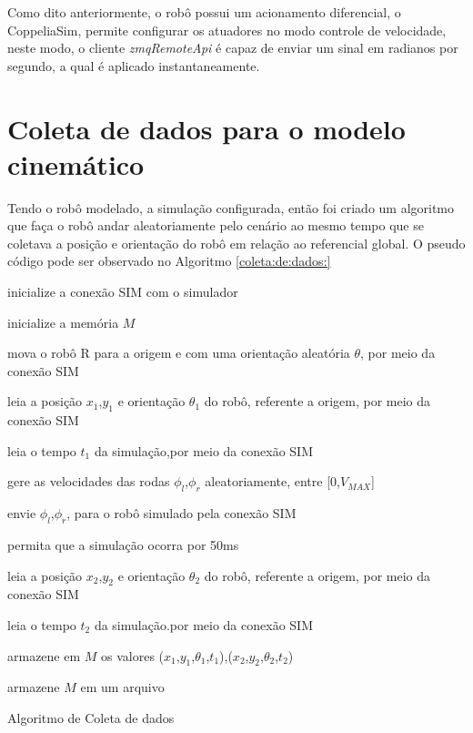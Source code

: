 Como dito anteriormente, o robô possui um acionamento diferencial,
o CoppeliaSim, permite configurar os atuadores no modo controle de
velocidade, neste modo, o cliente \textit{zmqRemoteApi} é capaz de enviar
um sinal em radianos por segundo, a qual é aplicado instantaneamente.


\section{Coleta de dados para o modelo cinemático}
Tendo o robô modelado, a simulação configurada, então foi criado
um algoritmo que faça o robô andar aleatoriamente pelo cenário ao mesmo
tempo que se coletava a posição e orientação do robô em relação ao referencial
global. O pseudo código pode ser observado no Algoritmo \ref{coleta:de:dados:}

\begin{algorithm}[H]
    \label{coleta:de:dados:}
    
    
    inicialize a conexão SIM  com o simulador

    inicialize a memória $M$

    mova o robô R para a origem e com uma orientação aleatória $\theta$,
    por meio da conexão SIM

     {
        leia a posição $x_1$,$y_1$  e orientação $\theta_{1}$ do robô,
        referente a origem, por meio da conexão SIM
        
        leia o tempo $t_1$ da simulação,por meio da conexão SIM
        
        gere as velocidades das rodas $\phi_l$,$\phi_r$ aleatoriamente,
        entre [0,$V_{MAX}$]
        
        envie  $\phi_l$,$\phi_r$, para o robô simulado pela conexão SIM

        permita que a simulação ocorra por 50ms 

        leia a posição $x_2$,$y_2$  e orientação $\theta_{2}$ do robô,
        referente a origem, por meio da conexão SIM

        leia o tempo $t_2$ da simulação.por meio da conexão SIM

        
        armazene em $M$ os valores  ($x_1$,$y_1$,$\theta_{1}$,$t_1$),($x_2$,$y_2$,$\theta_{2}$,$t_2$)
        
    }

    armazene $M$ em um arquivo
    
    \caption{Algoritmo de Coleta de dados}
    
\end{algorithm}

